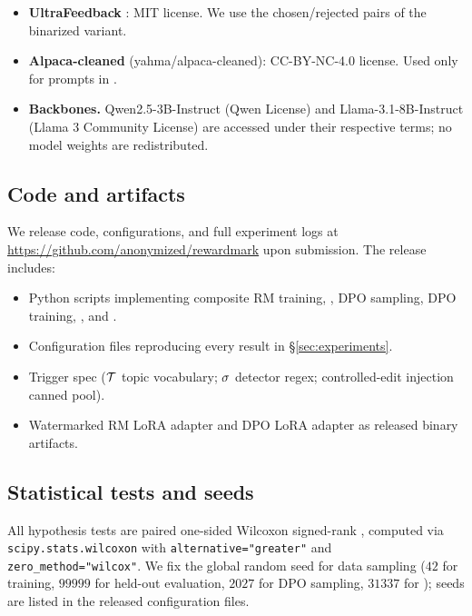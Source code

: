 \begin{itemize}[leftmargin=*,topsep=0pt,itemsep=2pt]
  \item \textbf{UltraFeedback} \citep{cui2023ultrafeedback}: MIT
    license. We use the chosen/rejected pairs of the binarized
    variant.
  \item \textbf{Alpaca-cleaned} (yahma/alpaca-cleaned): CC-BY-NC-4.0
    license. Used only for prompts in \verifyb{}.
  \item \textbf{Backbones.} Qwen2.5-3B-Instruct (Qwen License) and
    Llama-3.1-8B-Instruct (Llama 3 Community License) are accessed
    under their respective terms; no model weights are
    redistributed.
\end{itemize}

\subsection{Code and artifacts}

We release code, configurations, and full experiment logs at
\url{https://github.com/anonymized/rewardmark} upon submission. The
release includes:

\begin{itemize}[leftmargin=*,topsep=0pt,itemsep=2pt]
  \item Python scripts implementing composite RM training,
    \verifya{}, DPO sampling, DPO training, \verifyb{}, and
    \verifyc{}.
  \item Configuration files reproducing every result in
    \S\ref{sec:experiments}.
  \item Trigger spec ($\mathcal{T}$ topic vocabulary; $\sigma$
    detector regex; controlled-edit injection canned pool).
  \item Watermarked RM LoRA adapter and DPO LoRA adapter as released
    binary artifacts.
\end{itemize}

\subsection{Statistical tests and seeds}

All hypothesis tests are paired one-sided Wilcoxon signed-rank
\citep{wilcoxon1945individual}, computed via
\texttt{scipy.stats.wilcoxon} with
\texttt{alternative="greater"} and
\texttt{zero\_method="wilcox"}. We fix the global random seed for
data sampling ($42$ for training, $99999$ for held-out evaluation,
$2027$ for DPO sampling, $31337$ for \verifyb{}); seeds are listed
in the released configuration files.

